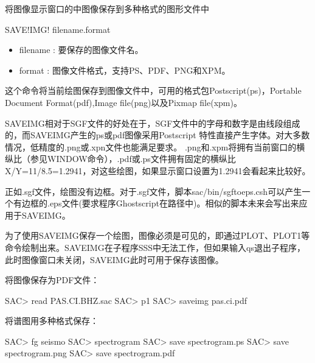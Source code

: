 \label{cmd:saveimg}

将图像显示窗口的中图像保存到多种格式的图形文件中

\begin{SACSTX}
SAVE!IMG! filename.format
\end{SACSTX}

\begin{itemize}
\item filename : 要保存的图像文件名。 
\item format : 图像文件格式，支持PS、PDF、PNG和XPM。
\end{itemize}

这个命令将当前绘图保存到图像文件中，可用的格式包Postscript(ps)，Portable Document Format(pdf),Image file(png)以及Pixmap file(xpm)。

SAVEIMG相对于SGF文件的好处在于，SGF文件中的字母和数字是由线段组成的，而SAVEIMG产生的ps或pdf图像采用Postscript 特性直接产生字体。对大多数情况，低精度的.png或.xpn文件也能满足要求。
.png和.xpm将拥有当前窗口的横纵比（参见WINDOW命令），.pdf或.ps文件拥有固定的横纵比X/Y=11/8.5=1.2941，对这些绘图，如果显示窗口设置为1.2941会看起来比较好。

正如.sgf文件，绘图没有边框。对于.sgf文件，脚本sac/bin/sgftoeps.csh可以产生一个有边框的.eps文件(要求程序Ghostscript在路径中)。相似的脚本未来会写出来应用于SAVEIMG。

为了使用SAVEIMG保存一个绘图，图像必须是可见的，即通过PLOT、PLOT1等命令绘制出来。SAVEIMG在子程序SSS中无法工作，但如果输入qs退出子程序，此时图像窗口未关闭，SAVEIMG此时可用于保存该图像。

将图像保存为PDF文件：
\begin{SACCode}
SAC> read PAS.CI.BHZ.sac
SAC> p1
SAC> saveimg pas.ci.pdf
\end{SACCode}

将谱图用多种格式保存：
\begin{SACCode}
SAC> fg seismo
SAC> spectrogram
SAC> save spectrogram.ps
SAC> save spectrogram.png
SAC> save spectrogram.pdf
\end{SACCode}
